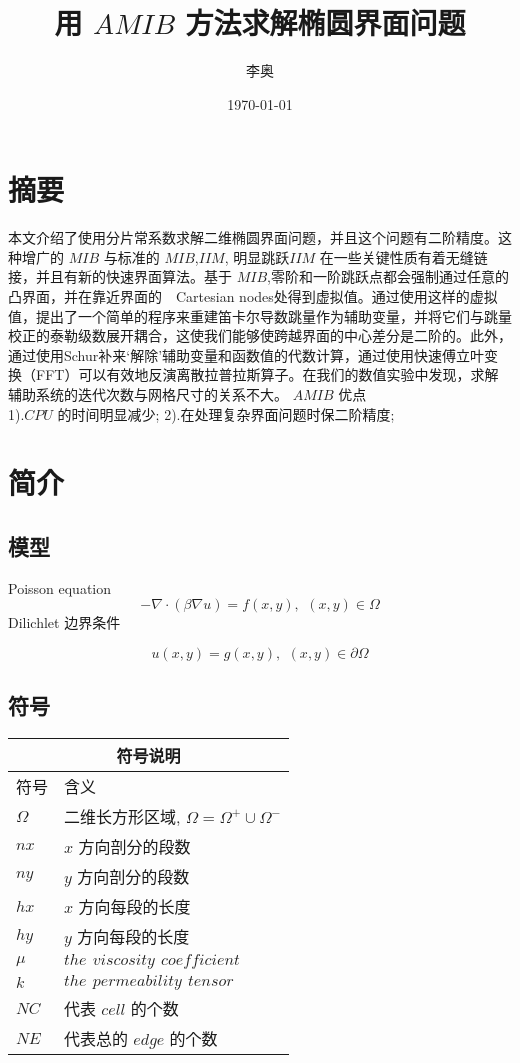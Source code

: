 \documentclass{article}
\begin{document}
\title{用 $AMIB$ 方法求解椭圆界面问题}
\author{李奥}
\date{\today}
\maketitle
\tableofcontents
\section{摘要}
本文介绍了使用分片常系数求解二维椭圆界面问题，并且这个问题有二阶精度。这种增广的 $MIB$ 与标准的 $MIB$,$IIM$, 明显跳跃$IIM$ 在一些关键性质有着无缝链接，并且有新的快速界面算法。基于 $MIB$,零阶和一阶跳跃点都会强制通过任意的凸界面，并在靠近界面的　Cartesian nodes处得到虚拟值。通过使用这样的虚拟值，提出了一个简单的程序来重建笛卡尔导数跳量作为辅助变量，并将它们与跳量校正的泰勒级数展开耦合，这使我们能够使跨越界面的中心差分是二阶的。此外，通过使用Schur补来‘解除’辅助变量和函数值的代数计算，通过使用快速傅立叶变换（FFT）可以有效地反演离散拉普拉斯算子。在我们的数值实验中发现，求解辅助系统的迭代次数与网格尺寸的关系不大。
$AMIB$ 优点\\
1).$CPU$ 的时间明显减少;
2).在处理复杂界面问题时保二阶精度; 

\section{简介}
\subsection{模型}
Poisson equation
\begin{equation}
-\nabla \cdot (\beta\nabla u) = f(x,y),\,\ (x,y)\in \Omega
\end{equation}
Dilichlet 边界条件

\begin{equation}
u(x,y) = g(x,y),\,\ (x,y)\in \partial \Omega
\end{equation}
\subsection{符号}
\begin{tabular}{ |l|l| }   
\hline   
\multicolumn{2}{|c|}{符号说明} \\   
\hline
符号 & 含义 \\
\hline
$\Omega$ & 二维长方形区域, $\Omega = \Omega^+ \cup \Omega^-$ \\
\hline
$nx$ & $x$ 方向剖分的段数 \\
\hline
$ny$ & $y$ 方向剖分的段数 \\
\hline
$hx$ &  $x$ 方向每段的长度\\
\hline
$hy$ &  $y$ 方向每段的长度 \\
\hline
$\mu$ & $the \,\ viscosity \,\ coefficient$ \\
\hline
$k$ & $the \,\ permeability \,\ tensor$ \\
\hline 
$NC$ & 代表 $cell$ 的个数 \\
\hline
$NE$ & 代表总的 $edge$ 的个数 \\
\hline
\end{tabular}
\end{document}
